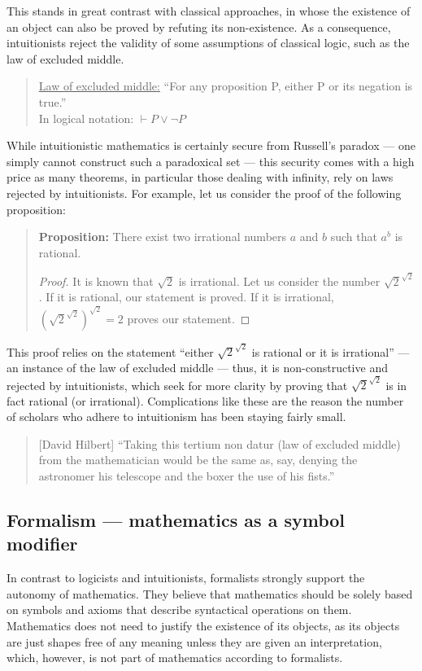 \documentclass[hidelinks]{article}
\begin{document}
This stands in great contrast with classical approaches, in whose the existence of an object can also be proved by refuting its non-existence. As a consequence, intuitionists reject the validity of some assumptions of classical logic, such as the law of excluded middle.
\begin{quote}
\underline{Law of excluded middle:} ``For any proposition P, either P or its negation is true.''\\ 
In logical notation: $\vdash P\lor\lnot P$
\end{quote}
While intuitionistic mathematics is certainly secure from Russell's paradox --- one simply cannot construct such a paradoxical set --- this security comes with a high price as many theorems, in particular those dealing with infinity, rely on laws rejected by intuitionists. For example, let us consider the proof of the following proposition:
\begin{quote}
\textbf{Proposition:} There exist two irrational numbers $a$ and $b$ such that $a^b$ is rational.
\vspace{-2em}
\begin{proof}
	It is known that $\sqrt{2}$ is irrational. Let us consider the number $\sqrt{2}^{\sqrt{2}}$. If it is rational, our statement is proved. If it is irrational, $(\sqrt{2}^{\sqrt{2}})^{\sqrt{2}}=2$ proves our statement.
\end{proof}
\end{quote}
This proof relies on the statement ``either $\sqrt{2}^{\sqrt{2}}$ is rational or it is irrational'' --- an instance of the law of excluded middle --- thus, it is non-constructive and rejected by intuitionists, which seek for more clarity by proving that $\sqrt{2}^{\sqrt{2}}$ is in fact rational (or irrational). Complications like these are the reason the number of scholars who adhere to intuitionism has been staying fairly small.

\begin{quote}[David Hilbert]
``Taking this tertium non datur (law of excluded middle) from the mathematician would be the same as, say, denying the astronomer his telescope and the boxer the use of his fists.''\cite{hilbert_tertium_non_datur}
\end{quote}

\subsection{Formalism --- mathematics as a symbol modifier}\label{ssec_formalism}
In contrast to logicists and intuitionists, formalists strongly support the autonomy of mathematics. 
They believe that mathematics should be solely based on symbols and axioms that describe syntactical operations on them. Mathematics does not need to justify the existence of its objects, as its objects are just shapes free of any meaning unless they are given an interpretation, which, however, is not part of mathematics according to formalists.
\end{document}
